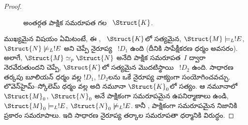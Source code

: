 \documentclass[../../../include/open-logic-section]{subfiles}
\begin{document}
\begin{proof}
\begin{figure}[h]
  \centering
  \caption{అంతర్గత పాక్షిక సమరూపత గల
    ~$\Struct{K}$.}
\end{figure}

ముఖ్యమైన విషయం ఏమిటంటే, ఈ ,
~$\Struct{K}$లో సత్యమైన,
$\Struct{M}\models_L!E$, $\Struct{N}\not\models_L!E$ అని చెప్పే
  నైరూప్య ~$!D_1$ ఉంది (దీనికి
సాపేక్షీకరణ ధర్మం అవసరం). అలాగే, $\Struct{M}\simeq_p\Struct{N}$
అనేది పాక్షిక సమరూపత~$I$ ద్వారా నెరవేరుతుందని చెప్పే, $\Struct{K}$లో
సత్యమైన మొదటిస్థాయి ~$!D_2$ ఉంది.
సాధారణ తర్కపు బూలియన్ ధర్మం వల్ల $!D_1$, $!D_2$లను ఒకే
  నైరూప్య వాక్యంగా సంయోగించవచ్చు. లొవెన్‌హైమ్--స్కోలెమ్ ధర్మం వల్ల అది
 నమూనా
$\Struct{K}_0$లో సత్యం. ఆ నమూనాలో $\Struct{M}_0$,
$\Struct{N}_0$ అనే పాక్షికంగా సమరూపమైన ఉపనిర్మాణాలు ఉండి,
$\Struct{M}_0\models_L!E$, $\Struct{N}_0\not\models_L!E$.
కానీ , పాక్షికంగా సమరూపమైన
 నిజానికి
 ప్రకారం సమరూపాలు. ఇది సాధారణ నైరూప్య
తర్కాల సమరూపతా ధర్మానికి విరుద్ధం.
\end{proof}
\end{document}
